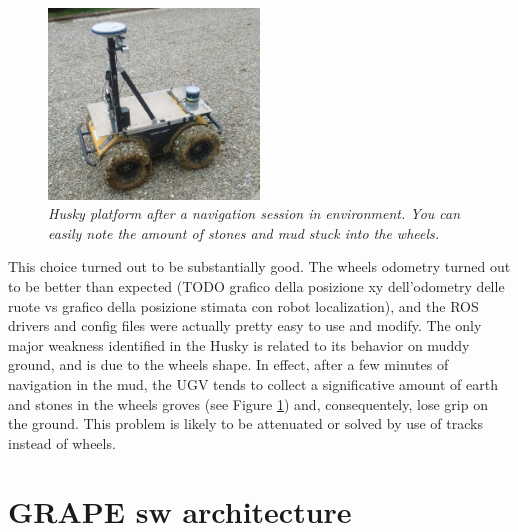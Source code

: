 \begin{figure}
	\centering
	\includegraphics[width=0.5\textwidth]{Images/grape_sw_hw_architecture/ruoteFangose.jpeg}
	\caption{\textit{Husky platform after a navigation session in environment. You can easily note the amount of stones and mud stuck into the wheels.}}
	\label{fig:ruoteFangose}
\end{figure}

This choice turned out to be substantially good. The wheels odometry turned out to be  better than expected (TODO grafico della posizione xy dell'odometry delle ruote vs grafico della posizione stimata con robot localization), and the \ac{ROS} drivers and config files were actually pretty easy to use and modify. The only major weakness identified in the Husky is related to its behavior on muddy ground, and is due to the wheels shape. In effect, after a few minutes of navigation in the mud, the \ac{UGV} tends to collect a significative amount of earth and stones in the wheels groves (see Figure \ref{fig:ruoteFangose}) and, consequentely, lose grip on the ground. This problem is likely to be attenuated or solved by use of tracks instead of wheels.

\section{GRAPE sw architecture}\label{sec:grapeSwArch}


